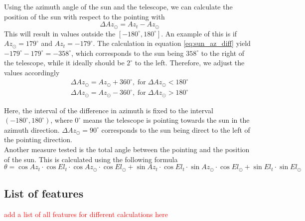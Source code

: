 Using the azimuth angle of the sun and the telescope, we can calculate the position of the sun with respect to the pointing with
\begin{equation}\label{eq:sun_az_diff}
    \Delta \textit{Az}_\odot = \textit{Az}_{\textit{t}} - \textit{Az}_\odot
\end{equation}
This will result in values outside the $[-180^\circ,180^\circ]$. An example of this is if $Az_\odot=179^\circ$ and $Az_t = -179^\circ$.
The calculation in equation \eqref{eq:sun_az_diff} yield $-179^\circ-179^\circ=-358^\circ$,
which corresponds to the sun being $358^\circ$ to the right of the telescope, while it ideally should be $2^\circ$ to the left.
Therefore, we adjust the values accordingly
\begin{align}
    \Delta Az_\odot = Az_\odot +360^\circ, \; \text{for} \; \Delta Az_\odot < 180^\circ\\
    \Delta Az_\odot = Az_\odot -360^\circ, \; \text{for} \; \Delta Az_\odot > 180^\circ
\end{align}

Here, the interval of the difference in azimuth is fixed to the interval $(-180^\circ,180^\circ)$,
where $0^\circ$ means the telescope is pointing towards the sun in the azimuth direction.
$\Delta \textit{Az}_\odot = 90^\circ$ corresponds to the sun being direct to the left of the pointing direction. \\

Another measure tested is the total angle between the pointing and the position of the sun. This is calculated using the following formula
\begin{equation}
    \theta = \cos \textit{Az}_t \cdot \cos \textit{El}_t\cdot \cos \textit{Az}_\odot \cdot \cos \textit{El}_\odot + \sin \textit{Az}_t \cdot \cos \textit{El}_t\cdot \sin \textit{Az}_\odot \cdot \cos \textit{El}_\odot + \sin \textit{El}_t \cdot \sin \textit{El}_\odot
\end{equation}

\subsection{List of features}
\textcolor{red}{add a list of all features for different calculations here}

